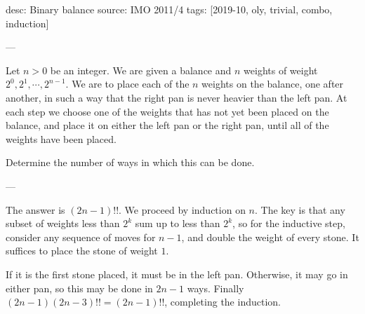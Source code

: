 desc: Binary balance
source: IMO 2011/4
tags: [2019-10, oly, trivial, combo, induction]

---

Let $n>0$ be an integer. We are given a balance and $n$ weights of weight $2^0,2^1,\cdots,2^{n-1}$. We are to place each of the $n$ weights on the balance, one after another, in such a way that the right pan is never heavier than the left pan. At each step we choose one of the weights that has not yet been placed on the balance, and place it on either the left pan or the right pan, until all of the weights have been placed.

Determine the number of ways in which this can be done.

---

The answer is $(2n-1)!!$. We proceed by induction on $n$. The key is that any subset of weights less than $2^k$ sum up to less than $2^k$, so for the inductive step, consider any sequence of moves for $n-1$, and double the weight of every stone. It suffices to place the stone of weight $1$.

If it is the first stone placed, it must be in the left pan. Otherwise, it may go in either pan, so this may be done in $2n-1$ ways. Finally $(2n-1)(2n-3)!!=(2n-1)!!$, completing the induction.

